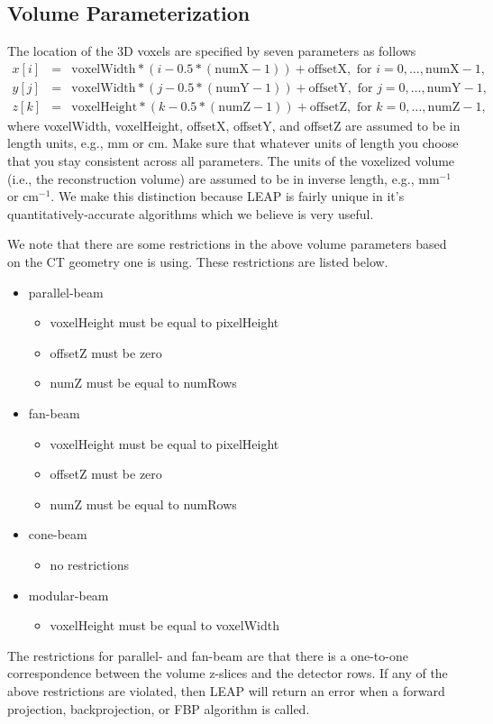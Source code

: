 \documentclass[11pt]{article}
\begin{document}
\subsection{Volume Parameterization} \label{sec:VolumeParameterization}

The location of the 3D voxels are specified by seven parameters as follows
\begin{eqnarray*}
x[i] &=& \text{voxelWidth}*(i - 0.5*(\text{numX}-1)) + \text{offsetX}, \text{ for } i = 0, \dots, \text{numX}-1, \\
y[j] &=& \text{voxelWidth}*(j - 0.5*(\text{numY}-1)) + \text{offsetY}, \text{ for } j = 0, \dots, \text{numY}-1, \\
z[k] &=& \text{voxelHeight}*(k - 0.5*(\text{numZ}-1)) + \text{offsetZ}, \text{ for } k = 0, \dots, \text{numZ}-1,
\end{eqnarray*}
where voxelWidth, voxelHeight, offsetX, offsetY, and offsetZ are assumed to be in length units, e.g., mm or cm.  Make sure that whatever units of length you choose that you stay consistent across all parameters.  The units of the voxelized volume (i.e., the reconstruction volume) are assumed to be in inverse length, e.g., mm$^{-1}$ or cm$^{-1}$.  We make this distinction because LEAP is fairly unique in it's quantitatively-accurate algorithms which we believe is very useful.

We note that there are some restrictions in the above volume parameters based on the CT geometry one is using.  These restrictions are listed below.
\begin{itemize}
\item parallel-beam
    \begin{itemize}
    \item voxelHeight must be equal to pixelHeight
    \item offsetZ must be zero
    \item numZ must be equal to numRows
    \end{itemize}
\item fan-beam
    \begin{itemize}
    \item voxelHeight must be equal to pixelHeight
    \item offsetZ must be zero
    \item numZ must be equal to numRows
    \end{itemize}
\item cone-beam
    \begin{itemize}
    \item no restrictions
    \end{itemize}
\item modular-beam
    \begin{itemize}
    \item voxelHeight must be equal to voxelWidth
    \end{itemize}
\end{itemize}
The restrictions for parallel- and fan-beam are that there is a one-to-one correspondence between the volume z-slices and the detector rows.  If any of the above restrictions are violated, then LEAP will return an error when a forward projection, backprojection, or FBP algorithm is called.
\end{document}
